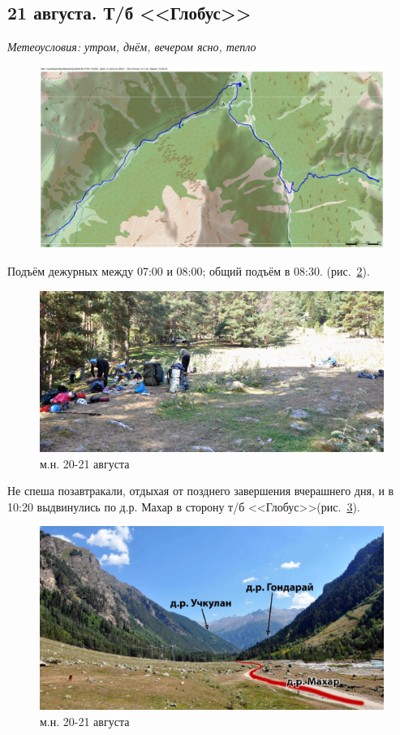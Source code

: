 \subsection{21 августа. Т/б <<Глобус>>}

\textit{Метеоусловия: утром, днём, вечером ясно, тепло}


\begin{figure}[h!]
	\centering
	\includegraphics[angle=0, width=0.7\linewidth]{../pics/mini_maps/21}
	\label{fig:mini_21}
\end{figure}

Подъём дежурных между 07:00 и 08:00; общий подъём в 08:30. (рис.~\ref{fig:DSC_0993}). 

\begin{figure}[h]
	\centering
	\includegraphics[width=0.7\linewidth]{../pics/DSC_0993}
	\caption{м.н. 20-21 августа}
	\label{fig:DSC_0993}
\end{figure}

Не спеша позавтракали, отдыхая от позднего завершения вчерашнего дня, и в 10:20 выдвинулись по д.р. Махар в сторону т/б <<Глобус>>(рис.~\ref{fig:DSC_1003}). 

\begin{figure}[h]
	\centering
	\includegraphics[width=0.7\linewidth]{../pics/DSC_1003}
	\caption{м.н. 20-21 августа}
	\label{fig:DSC_1003}
\end{figure}

